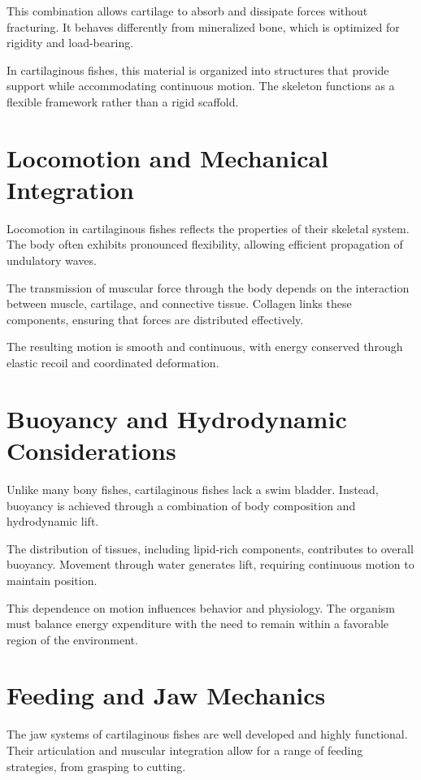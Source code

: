 \documentclass[11pt,oneside]{book}
\begin{document}
This combination allows cartilage to absorb and dissipate forces without fracturing. It behaves differently from mineralized bone, which is optimized for rigidity and load-bearing.

In cartilaginous fishes, this material is organized into structures that provide support while accommodating continuous motion. The skeleton functions as a flexible framework rather than a rigid scaffold.

\section{Locomotion and Mechanical Integration}

Locomotion in cartilaginous fishes reflects the properties of their skeletal system. The body often exhibits pronounced flexibility, allowing efficient propagation of undulatory waves.

The transmission of muscular force through the body depends on the interaction between muscle, cartilage, and connective tissue. Collagen links these components, ensuring that forces are distributed effectively.

The resulting motion is smooth and continuous, with energy conserved through elastic recoil and coordinated deformation.

\section{Buoyancy and Hydrodynamic Considerations}

Unlike many bony fishes, cartilaginous fishes lack a swim bladder. Instead, buoyancy is achieved through a combination of body composition and hydrodynamic lift.

The distribution of tissues, including lipid-rich components, contributes to overall buoyancy. Movement through water generates lift, requiring continuous motion to maintain position.

This dependence on motion influences behavior and physiology. The organism must balance energy expenditure with the need to remain within a favorable region of the environment.

\section{Feeding and Jaw Mechanics}

The jaw systems of cartilaginous fishes are well developed and highly functional. Their articulation and muscular integration allow for a range of feeding strategies, from grasping to cutting.
\end{document}
